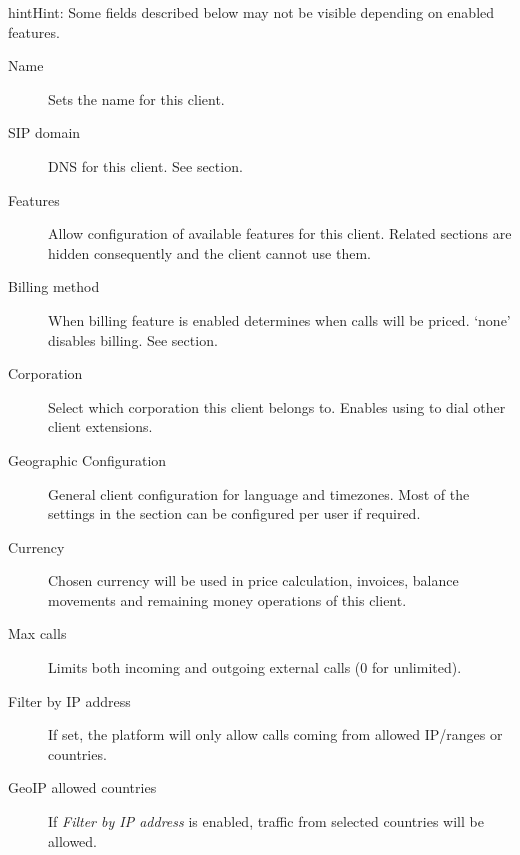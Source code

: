 \documentclass[letterpaper,10pt,english]{sphinxmanual}
\begin{document}
\begin{notice}{hint}{Hint:}
Some fields described below may not be visible depending on enabled features.
\begin{description}
\item[{Name}] \leavevmode
Sets the name for this client.

\item[{SIP domain}] \leavevmode
DNS for this client. See {\hyperref[getting_started/internal_calls/brand_portal:client\string-sip\string-domain]{}} section.

\item[{Features}] \leavevmode
Allow configuration of available features for this client.
Related sections are hidden consequently and the client cannot use them.

\item[{Billing method}] \leavevmode
When billing feature is enabled determines when calls will be priced. `none' disables billing.
See {\hyperref[administration_portal/brand/billing/index:billing]{}} section.

\item[{Corporation}] \leavevmode
Select which corporation this client belongs to. Enables using {\hyperref[administration_portal/client/vpbx/routing_endpoints/friends/internal_friends:internal\string-friends]{}} to
dial other client extensions.

\item[{Geographic Configuration}] \leavevmode
General client configuration for language and timezones. Most of the settings in the section can be
configured per user if required.

\item[{Currency}] \leavevmode
Chosen currency will be used in price calculation, invoices, balance movements and
remaining money operations of this client.

\item[{Max calls}] \leavevmode
Limits both incoming and outgoing external calls (0 for unlimited).

\item[{Filter by IP address}] \leavevmode
If set, the platform will only allow calls coming from allowed IP/ranges or countries.

\item[{GeoIP allowed countries}] \leavevmode
If \emph{Filter by IP address} is enabled, traffic from selected countries will be allowed.


\end{description}
\end{notice}
\end{document}
